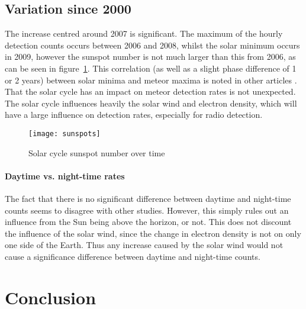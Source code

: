 \subsection{Variation since 2000}
The increase centred around 2007 is significant. The maximum of the hourly detection counts occurs between 2006 and 2008, whilst the solar minimum occurs in 2009, however the sunspot number is not much larger than this from 2006, as can be seen in figure~\ref{fig:temp:sunspot}. This correlation (as well as a slight phase difference of 1 or 2 years) between solar minima and meteor maxima is noted in other articles \cite{lindblad}. That the solar cycle has an impact on meteor detection rates is not unexpected. The solar cycle influences heavily the solar wind and electron density, which will have a large influence on detection rates, especially for radio detection.
\begin{figure}[h!]
	\centering
	\texttt{[image: sunspots]}
	\caption{Solar cycle sunspot number over time \cite{sunspot}
		\label{fig:temp:sunspot}}
\end{figure}
\paragraph{Daytime vs. night-time rates\\}
The fact that there is no significant difference between daytime and night-time counts seems to disagree with other studies. However, this simply rules out an influence from the Sun being above the horizon, or not. This does not discount the influence of the solar wind, since the change in electron density is not on only one side of the Earth. Thus any increase caused by the solar wind would not cause a significance difference between daytime and night-time counts.
\section{Conclusion}